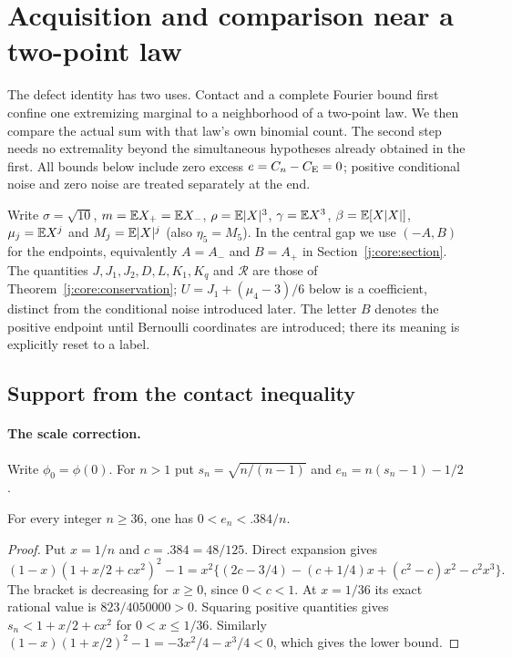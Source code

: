 \providecommand{\phio}{\phi(0)}
\providecommand{\cR}{\mathcal R}
\providecommand{\Prb}{\mathbb P}
\providecommand{\nm}{\mathrm}
\section{Acquisition and comparison near a two-point law}
\label{j:local:section}
The defect identity has two uses. Contact and a complete Fourier bound
first confine one extremizing marginal to a neighborhood of a two-point
law. We then compare the actual sum with that law's own binomial count.
The second step needs no extremality beyond the simultaneous hypotheses
already obtained in the first. All bounds below include zero excess
$e=C_n-C_{\mathrm E}=0$; positive conditional noise and zero noise are treated
separately at the end.

Write $\sigma=\sqrt{10}$, $m=\mathbb E X_+=\mathbb E X_-$,
$\rho=\mathbb E|X|^3$, $\gamma=\mathbb E X^3$, $\beta=\mathbb E[X|X|]$,
$\mu_j=\mathbb E X^j$ and $M_j=\mathbb E|X|^j$ (also $\eta_5=M_5$).
In the central gap we use $(-A,B)$ for the endpoints, equivalently
$A=A_-$ and $B=A_+$ in Section~\ref{j:core:section}.
The quantities $J,J_1,J_2,D,L,K_1,K_q$ and $\mathcal R$ are those of
Theorem~\ref{j:core:conservation}; $U=J_1+(\mu_4-3)/6$ below is a
coefficient, distinct from the conditional noise introduced later.
The letter $B$ denotes the positive endpoint until Bernoulli coordinates
are introduced; there its meaning is explicitly reset to a label.


\subsection{Support from the contact inequality}\label{j:local:support:theorem}
\paragraph{The scale correction.}
Write $\phi_0=\phi(0)$.
For $n>1$ put $s_n=\sqrt{n/(n-1)}$ and
$e_n=n(s_n-1)-1/2$.
\begin{lemma}\label{j:local:support:scale}
For every integer $n\ge36$, one has $0<e_n<.384/n$.
\end{lemma}
\begin{proof}
Put $x=1/n$ and $c=.384=48/125$. Direct expansion gives
\[
 (1-x)(1+x/2+cx^2)^2-1
 =x^2\{(2c-3/4)-(c+1/4)x+(c^2-c)x^2-c^2x^3\}.
\]
The bracket is decreasing for $x\ge0$, since $0<c<1$.
At $x=1/36$ its exact rational value is $823/4050000>0$.
Squaring positive quantities gives
$s_n<1+x/2+cx^2$ for $0<x\le1/36$. Similarly
$(1-x)(1+x/2)^2-1=-3x^2/4-x^3/4<0$, which gives the lower bound.
\end{proof}


